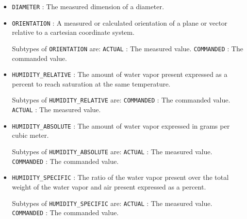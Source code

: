 \begin{itemize}
\item \texttt{DIAMETER} : The measured dimension of a diameter. 

\item \texttt{ORIENTATION} : A measured or calculated orientation of a plane or vector relative to a cartesian coordinate system. 

Subtypes of \texttt{ORIENTATION} are: 
\newline\tab \texttt{ACTUAL} : The measured value. 
\newline\tab \texttt{COMMANDED} : The commanded value. 
\item \texttt{HUMIDITY_RELATIVE} : The amount of water vapor present expressed as a percent to reach saturation at the same temperature. 

Subtypes of \texttt{HUMIDITY_RELATIVE} are: 
\newline\tab \texttt{COMMANDED} : The commanded value. 
\newline\tab \texttt{ACTUAL} : The measured value. 
\item \texttt{HUMIDITY_ABSOLUTE} : The amount of water vapor expressed in grams per cubic meter. 

Subtypes of \texttt{HUMIDITY_ABSOLUTE} are: 
\newline\tab \texttt{ACTUAL} : The measured value. 
\newline\tab \texttt{COMMANDED} : The commanded value. 
\item \texttt{HUMIDITY_SPECIFIC} : The ratio of the water vapor present over the total weight of the water vapor and air present expressed as a percent. 

Subtypes of \texttt{HUMIDITY_SPECIFIC} are: 
\newline\tab \texttt{ACTUAL} : The measured value. 
\newline\tab \texttt{COMMANDED} : The commanded value. 
\end{itemize}

\FloatBarrier

